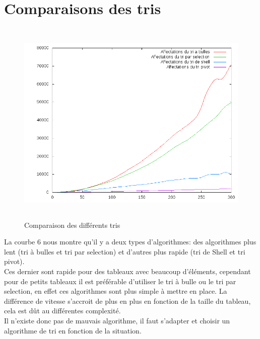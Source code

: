 \documentclass[12pt,a4paper,openany]{article}
\begin{document}
	\section{Comparaisons des tris}
		\begin{figure}[!h] 
			\begin{center}	
				\includegraphics[height=10cm]{lesquatretris.png}										
				\caption{Comparaison des différents tris}
			\end{center}
		\end{figure}
		La courbe 6 nous montre qu'il y a deux types d'algorithmes: des algorithmes plus lent (tri à bulles et tri par selection) et d'autres plus rapide (tri de Shell et tri pivot). \\
		Ces dernier sont rapide pour des tableaux avec beaucoup d'éléments, cependant pour de petits tableaux il est préférable d'utiliser le tri à bulle ou le tri par selection, en effet ces algorithmes sont plus simple à mettre en 
		place. La différence de vitesse s'accroit de plus en plus en fonction de la taille du tableau, cela est dût au différentes complexité. \\
		Il n'existe donc pas de mauvais algorithme, il faut s'adapter et choisir un algorithme de tri en fonction de la situation.
\end{document}

